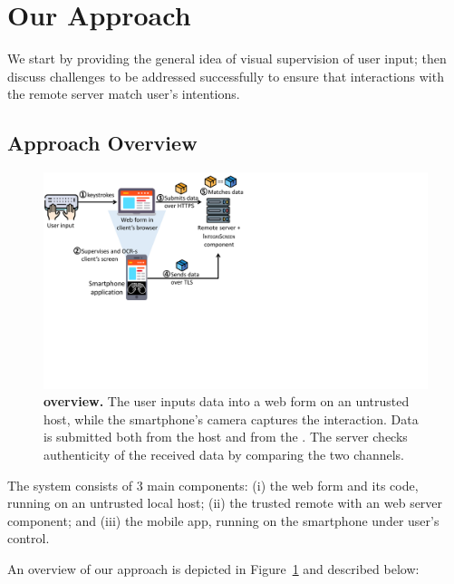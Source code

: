 \section{Our Approach}
\label{integriscreen:sec:systemDesign}

We start by providing the general idea of visual supervision of user input; then discuss challenges to be addressed successfully to ensure that interactions with the remote server match user's intentions.


\subsection{Approach Overview}
\label{integriscreen:sec:systemDesign:overallApproach}


\begin{figure}[t]
	\centering
	\includegraphics[trim={0 7cm 17cm 0},clip,width=0.75\linewidth]{chapters/IntegriScreen/img/systemModel.pdf}
	\caption[\sysname overview.]{\textbf{\sysname overview.}
	    \one The user inputs data into a web form on an untrusted host, \two while the smartphone's camera captures the interaction.
	    \three Data is submitted both from the host and \four from the \app.
		\five The server checks authenticity of the received data by comparing the two channels.}
	\label{integriscreen:fig:systemModel}
\end{figure}


The system consists of 3 main components: (i) the web form and its code, running on an untrusted local host; (ii) the trusted remote \server with an \name web server component; and (iii) the mobile app, running on the smartphone under user's control.

An overview of our approach is depicted in Figure~\ref{integriscreen:fig:systemModel} and described below:

